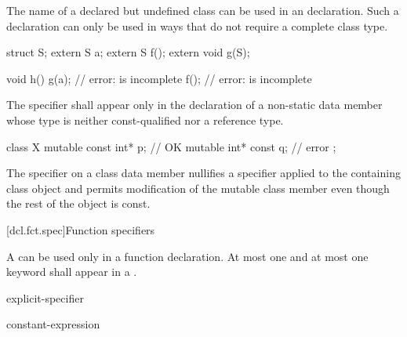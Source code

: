 \pnum
{}%
The name of a declared but undefined class can be used in an
 declaration. Such a declaration can only be used in ways
that do not require a complete class type.
\begin{example}
\begin{codeblock}
struct S;
extern S a;
extern S f();
extern void g(S);

void h() {
  g(a);                         // error:  is incomplete
  f();                          // error:  is incomplete
}
\end{codeblock}
\end{example}

\pnum
The  specifier shall appear only in the declaration of
a non-static data member
whose type is neither const-qualified nor a reference type.
\begin{example}
\begin{codeblock}
class X {
  mutable const int* p;         // OK
  mutable int* const q;         // error
};
\end{codeblock}
\end{example}

\pnum
\begin{note}
The  specifier on a class data member nullifies a
 specifier applied to the containing class object and
permits modification of the mutable class member even though the rest of
the object is const.
\end{note}

[dcl.fct.spec]{Function specifiers}%
%

\pnum
A
can be used only in a function declaration.
At most one  and
at most one  keyword shall appear in
a .

\begin{bnf}
\br
    \br
    explicit-specifier
\end{bnf}

\begin{bnf}
\br
     \terminal{(} constant-expression \terminal{)}\br
\end{bnf}

